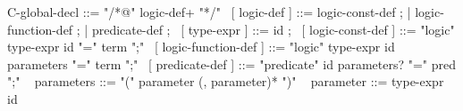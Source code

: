 \begin{syntax}
  C-global-decl ::= { "/*@" logic-def+ "*/" }
  \
  [ { logic-def } ] ::= { logic-const-def } ;
          | { logic-function-def } ;
          | { predicate-def } ;
  \
  [ { type-expr } ] ::= { id };
  \
  [ { logic-const-def } ] ::= { "logic" type-expr id "=" term ";" }
  \
  [ { logic-function-def } ] ::= { "logic" type-expr id parameters "=" term ";" }
  \
  [ { predicate-def } ] ::= { "predicate" id parameters? "=" pred ";" }
  \
  { parameters } ::= { "(" parameter (, parameter)* ")" }
  \
  { parameter } ::= { type-expr id }
\end{syntax}
